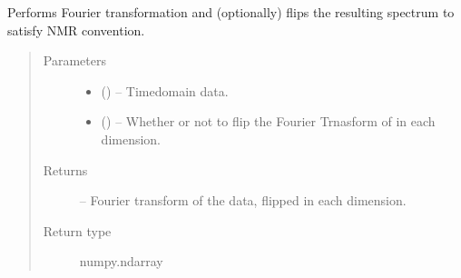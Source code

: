 \documentclass[letterpaper,10pt,english]{sphinxmanual}
\begin{document}
\begin{fulllineitems}
\label{\detokenize{references/sig:nmrespy.sig.ft}}
\sphinxAtStartPar
Performs Fourier transformation and (optionally) flips the resulting
spectrum to satisfy NMR convention.
\begin{quote}\begin{description}
\item[{Parameters}] \leavevmode\begin{itemize}
\item {} 
\sphinxAtStartPar
{} () – Time\sphinxhyphen{}domain data.

\item {} 
\sphinxAtStartPar
{} (\sphinxstyleliteralemphasis{\sphinxupquote{, }}) – Whether or not to flip the Fourier Trnasform of  in each
dimension.

\end{itemize}

\item[{Returns}] \leavevmode
\sphinxAtStartPar
{} – Fourier transform of the data, flipped in each dimension.

\item[{Return type}] \leavevmode
\sphinxAtStartPar
numpy.ndarray

\end{description}\end{quote}

\end{fulllineitems}

\end{document}

